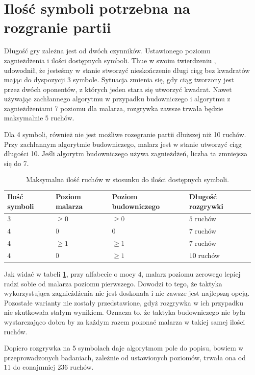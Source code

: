 \documentclass[document]{xmgr}
\begin{document}
\section{Ilość symboli potrzebna na rozgranie partii}
Długość gry zależna jest od dwóch czynników. Ustawionego poziomu zagnieżdżenia i ilości dostępnych symboli. Thue w swoim twierdzeniu \cite{repetition}, udowodnił, że jesteśmy w stanie stworzyć nieskończenie długi ciąg bez kwadratów mając do dyspozycji 3 symbole. Sytuacja zmienia się, gdy ciąg tworzony jest przez dwóch oponentów, z których jeden stara się utworzyć kwadrat. Nawet używając zachłannego algorytmu w przypadku budowniczego i algorytmu z zagnieżdżeniami 7 poziomu dla malarza, rozgrywka zawsze trwała będzie maksymalnie 5 ruchów. 

Dla 4 symboli, również nie jest możliwe rozegranie partii dłuższej niż 10 ruchów. Przy zachłannym algorytmie budowniczego, malarz jest w stanie utworzyć ciąg długości 10. Jeśli algorytm budowniczego używa zagnieżdżeń, liczba ta zmniejsza się do 7.

\begin{table}[H]
    \centering
	\begin{tabular}{|l|l|l|l|} \hline
	Ilość symboli & Poziom malarza & Poziom budowniczego & Długość rozgrywki \\ \hline
	$3$ & $\geq 0$ & $\geq 0$ & $5$ ruchów\\ \hline
	$4$ & $0$ & $0$ & $7$ ruchów\\ \hline
	$4$ & $\geq 1 $ & $\geq 1$ & $7$ ruchów\\ \hline
	$4$ & $0$ & $\geq 1$ & $10$ ruchów\\ \hline
	\end{tabular}
	\caption{Maksymalna ilość ruchów w stosunku do ilości dostępnych symboli.}
	\label{fig:maxGameLength}
\end{table}

Jak widać w tabeli \ref{fig:maxGameLength}, przy alfabecie o mocy 4, malarz poziomu zerowego lepiej radzi sobie  od malarza poziomu pierwszego. Dowodzi to tego, że taktyka wykorzystująca zagnieżdżenia nie jest doskonała i nie zawsze jest najlepszą opcją. Pozostałe warianty nie zostały przedstawione, gdyż rozgrywka w ich przypadku nie skutkowała stałym wynikiem. Oznacza to, że taktyka budowniczego nie była wystarczająco dobra by za każdym razem pokonać malarza w takiej samej ilości ruchów.


Dopiero rozgrywka na 5 symbolach daje algorytmom pole do popisu, bowiem w przeprowadzonych badaniach, zależnie od ustawionych poziomów, trwała ona od 11 do conajmniej 236 ruchów.
\end{document}
